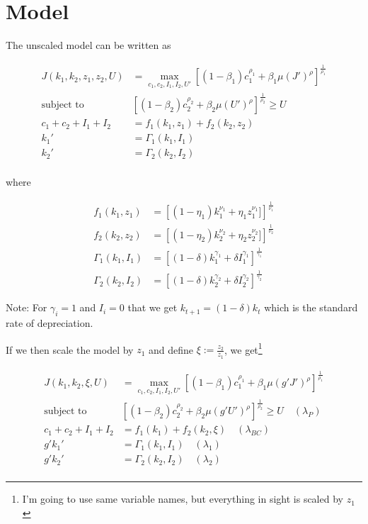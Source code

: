 \documentclass[10pt]{article}
\begin{document}
\section{Model}

  The unscaled model can be written as

  \begin{align*}
    J(k_1, k_2, z_1, z_2, U) &= \max_{c_1, c_2, I_1, I_2, U'} \left[ (1 - \beta_1) c_1^{\rho_1} + \beta_1 \mu(J')^\rho \right]^{\frac{1}{\rho_1}} \\
    \text{subject to }& \left[ (1 - \beta_2) c_2^{\rho_2} + \beta_2 \mu(U')^\rho \right]^{\frac{1}{\rho_2}} \ge U \\
    c_1 + c_2 + I_1 + I_2 &= f_1(k_1, z_1) + f_2(k_2, z_2) \\
    k_1' &= \Gamma_1(k_1, I_1) \\
    k_2' &= \Gamma_2(k_2, I_2) \\
  \end{align*}

  where

  \begin{align*}
    f_1(k_1, z_1) &= \left[(1 - \eta_1) k_1^{\nu_1} + \eta_1 z_1^{\nu_1}] \right]^{\frac{1}{\nu_1}} \\
    f_2(k_2, z_2) &= \left[(1 - \eta_2) k_2^{\nu_2} + \eta_2 z_2^{\nu_2}] \right]^{\frac{1}{\nu_2}} \\
    \Gamma_1(k_1, I_1) &= \left[(1 - \delta) k_1^{\gamma_1} + \delta I_1^{\gamma_1} \right]^{\frac{1}{\gamma_1}} \\
    \Gamma_2(k_2, I_2) &= \left[(1 - \delta) k_2^{\gamma_2} + \delta I_2^{\gamma_2} \right]^{\frac{1}{\gamma_2}}
  \end{align*}

  Note: For $\gamma_i = 1$ and $I_i = 0$ that we get $k_{t+1} = (1 - \delta) k_t$ which is the standard rate of depreciation.

  If we then scale the model by $z_1$ and define $\xi := \frac{z_2}{z_1}$, we
  get\footnote{I'm going to use same variable names, but everything in sight is
  scaled by $z_1$}

  \begin{align*}
    J(k_1, k_2, \xi, U) &= \max_{c_1, c_2, I_1, I_2, U'} \left[ (1 - \beta_1) c_1^{\rho_1} + \beta_1 \mu(g' J')^\rho \right]^{\frac{1}{\rho_1}} \\
    \text{subject to }& \left[ (1 - \beta_2) c_2^{\rho_2} + \beta_2 \mu(g' U')^\rho \right]^{\frac{1}{\rho_2}} \ge U \quad (\lambda_P) \\
    c_1 + c_2 + I_1 + I_2 &= f_1(k_1) + f_2(k_2, \xi) \quad (\lambda_{BC}) \\
    g' k_1' &= \Gamma_1(k_1, I_1) \quad (\lambda_1) \\
    g' k_2' &= \Gamma_2(k_2, I_2) \quad (\lambda_2) \\
  \end{align*}
\end{document}
